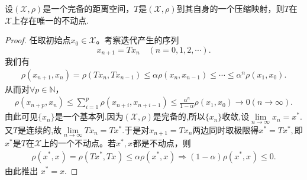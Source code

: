 \documentclass[../../main.tex]{subfiles}%
\begin{document}
\begin{theorem}\label{theorem:Banach不动点定理——压缩映象原理}
设$(\mathscr{X},\rho)$是一个完备的距离空间，$T$是$(\mathscr{X},\rho)$到其自身的一个压缩映射，则$T$在$\mathscr{X}$上存在唯一的不动点.
\end{theorem}
\begin{proof}

任取初始点$x_0 \in \mathscr{X}$。考察迭代产生的序列
$$x_{n+1} = Tx_n \quad (n = 0,1,2,\cdots).$$
我们有
\begin{align*}
\rho(x_{n+1}, x_n) = \rho(Tx_n, Tx_{n-1}) \leqslant \alpha \rho(x_n, x_{n-1}) \leqslant \cdots \leqslant \alpha^n \rho(x_1, x_0).
\end{align*}
从而对$\forall p \in \mathbb{N}$，
\begin{align*}
\rho(x_{n+p}, x_n) \leqslant \sum_{i=1}^p \rho(x_{n+i}, x_{n+i-1}) \leqslant \frac{\alpha^n}{1 - \alpha} \rho(x_1, x_0) \to 0(n \to \infty).
\end{align*}
由此可见$\{x_n\}$是一个基本列.因为$(\mathscr{X},\rho)$是完备的,所以$\{x_n\}$收敛,设$\underset{n\rightarrow \infty}{\lim}x_n=x^*.$又$T$是连续的,故$\underset{n\rightarrow \infty}{\lim}Tx_n=Tx^*.$于是对$x_{n+1} = Tx_n$两边同时取极限得$x^*=Tx^*,$即$x^*$是$T$在$\mathscr{X}$上的一个不动点。若$x^*, x^{ }$都是不动点，则
\begin{align*}
\rho \left( x^*,x^{ } \right) =\rho \left( Tx^*,Tx^{ } \right) \leqslant \alpha \rho \left( x^*,x^{ } \right) \Longrightarrow \left( 1-\alpha \right) \rho \left( x^*,x^{ } \right) \leqslant 0.
\end{align*}
由此推出
$x^* = x.$
\end{proof}
\end{document}
